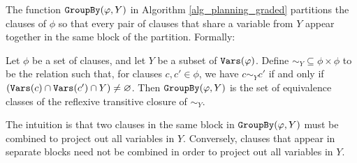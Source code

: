 

The function $\texttt{\upshape GroupBy}(\varphi, Y)$ in Algorithm \ref{alg_planning_graded} partitions the clauses of $\phi$ so that every pair of clauses that share a variable from $Y$ appear together in the same block of the partition.
Formally:
\begin{definition}
\label{def:groupby}
Let $\phi$ be a set of clauses, and let $Y$ be a subset of $\texttt{\upshape Vars}(\varphi)$.
Define $\sim_Y \subseteq \phi \times \phi$ to be the relation such that, for clauses $c, c' \in \phi$, we have $c \sim_Y c'$ if and only if $(\texttt{\upshape Vars}(c) \cap \texttt{\upshape Vars}(c') \cap Y) \ne \varnothing$. Then $\texttt{\upshape GroupBy}(\varphi, Y)$ is the set of equivalence classes of the reflexive transitive closure of $\sim_Y$.
\end{definition}

The intuition is that two clauses in the same block in $\texttt{\upshape GroupBy}(\varphi, Y)$ must be combined to project out all variables in $Y$.
Conversely, clauses that appear in separate blocks need not be combined in order to project out all variables in $Y$. 


